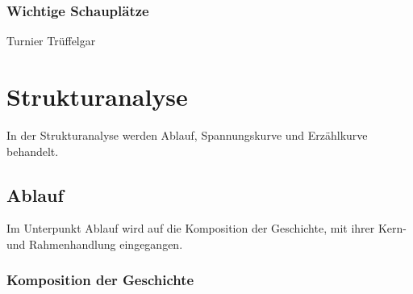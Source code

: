 {\subsubsection{Wichtige Schauplätze}
Turnier
Trüffelgar	
	
\section{Strukturanalyse}
In der Strukturanalyse werden Ablauf, Spannungskurve und Erzählkurve behandelt.

\subsection{Ablauf}
Im Unterpunkt Ablauf wird auf die Komposition der Geschichte, mit ihrer Kern- und Rahmenhandlung eingegangen.

\subsubsection{Komposition der Geschichte}

}
